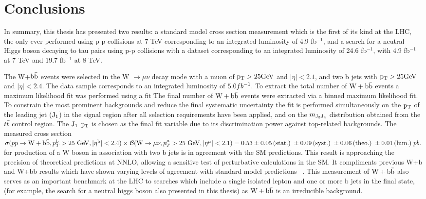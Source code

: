\chapter{Conclusions}
In summary, this thesis has presented two results:
a standard model cross section measurement 
which is the first of its kind at the LHC, the only 
ever performed using p-p collisions at 7 TeV corresponding to
an integrated luminosity of 4.9 fb$^{-1}$, and a search for 
a neutral Higgs boson decaying to tau pairs using p-p collisions
with a dataset corresponding to an integrated luminosity of 
24.6 fb$^{-1}$, with 4.9 fb$^{-1}$ at 7 TeV and 19.7 fb$^{-1}$ at 8 TeV. 

The W+$\mathrm{b\bar{b}}$ events were selected in the W $\to \mu\nu$ decay mode with a 
muon of $\mathrm{p_{T}}>25\mathrm{GeV}$ and $|\eta|<2.1$, and two b jets with $\mathrm{p_{T}}>25\mathrm{GeV}$ and $|\eta|<2.4$. 
The data sample corresponds to an integrated luminosity of $5.0fb^\mathrm{-1}$. 
To extract the total number of $\mathrm{W+\mathrm{b\bar{b}}}$ events a maximum likelihood fit
was performed using a fit 
The final number of $\mathrm{W+\mathrm{b\bar{b}}}$ events were extracted via a binned maximum likelihood fit.
To constrain the most prominent backgrounds and reduce the final
systematic uncertainty the fit is performed simultaneously on the $\mathrm{p_{T}}$ of the leading jet ($\rm{J_1}$) 
in the signal region after all selection requirements have been applied,
and on the $m_{\rm{J_3 J_4}}$ distribution obtained from the $t\bar{t}$ control region.
The  $\rm{J_1}$ $\mathrm{p_{T}}$  is chosen as the final fit variable due to its discrimination power against top-related backgrounds. The measured cross section 
$\sigma(pp\rightarrow \mathrm{W} + \mathrm{b\bar{b}}, p_T^{\mathrm{b}}>25~\mathrm{GeV}, |\eta^{\mathrm{b}}|<2.4)\times {\cal{B}}(\mathrm{W}\rightarrow \mu\nu, p_T^{\mu}>25~\mathrm{GeV}, |\eta^{\mu}|<2.1) =0.53\pm  0.05\,\mathrm{(stat.)\;} \pm 0.09 \,\mathrm{(syst.)\;} \pm 0.06 \,\mathrm{(theo.)}\; \pm 0.01\,\mathrm{(lum.)\;} pb.$
for production of a W boson in association with two b jets is in agreement with
the SM predictions.
This result is approaching the precision of theoretical predictions at NNLO, 
allowing a sensitive test of perturbative calculations
in the SM. It compliments previous W+b and W+bb results which
have shown varying levels of agreement 
with standard model predictions ~\cite{Aaltonen:2009qi,D0:2012qt,Aad:2011kp}. 
This measurement of $\mathrm{W+\mathrm{b\bar{b}}}$ also serves as an important
benchmark at the LHC to 
searches which include a single isolated lepton and one or more b jets in the final state,
(for example, the search for a neutral higgs boson also presented in this thesis) 
as $\mathrm{W+\mathrm{b\bar{b}}}$ is an irreducible background. %

